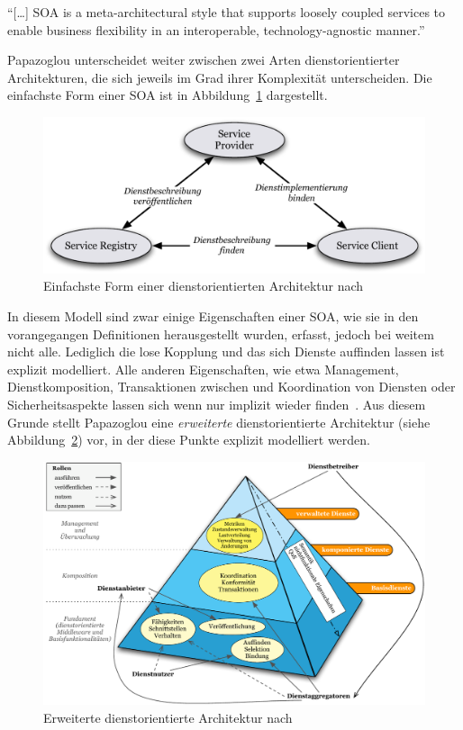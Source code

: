 \begin{definition}\label{def:soa_papazoglou_}
  "`[\ldots] SOA is a meta-architectural style that supports loosely coupled services to enable business flexibility in an interoperable, technology-agnostic manner."' \emph{\citep[S. 257]{web_services_principles_and_technology}}
\end{definition}

  Papazoglou unterscheidet weiter zwischen zwei Arten dienstorientierter Architekturen, die sich jeweils im Grad ihrer Komplexität unterscheiden. Die einfachste Form einer SOA ist in Abbildung~\ref{fig:images_Basic_SOA} dargestellt.

  \begin{figure}[!ht]
    \centering
      \includegraphics[width=.9\textwidth]{images/Basic_SOA.pdf}
    \caption{Einfachste Form einer dienstorientierten Architektur nach \citep{service_oriented_computing}}
    \label{fig:images_Basic_SOA}
  \end{figure}

  In diesem Modell sind zwar einige Eigenschaften einer SOA, wie sie in den vorangegangen Definitionen herausgestellt wurden, erfasst, jedoch bei weitem nicht alle. Lediglich die lose Kopplung und das sich Dienste auffinden lassen ist explizit modelliert. Alle anderen Eigenschaften, wie etwa Management, Dienstkomposition, Transaktionen zwischen und Koordination von Diensten oder Sicherheitsaspekte lassen sich wenn nur implizit wieder finden~\cite[S. 8]{service_oriented_computing}. Aus diesem Grunde stellt Papazoglou eine \emph{erweiterte} dienstorientierte Architektur (siehe Abbildung~\ref{fig:images_Extended_SOA}) vor, in der diese Punkte explizit modelliert werden.

  \begin{figure}[!ht]
    \centering
      \includegraphics[width=.9\textwidth]{images/Extended_SOA.pdf}
    \caption{Erweiterte dienstorientierte Architektur nach  \citep{papazoglou2007soc}}
    \label{fig:images_Extended_SOA}
  \end{figure}

